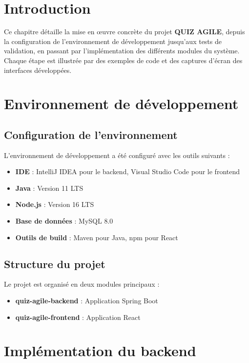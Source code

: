 \documentclass[12pt,a4paper]{report}
\begin{document}
\section{Introduction}

Ce chapitre détaille la mise en œuvre concrète du projet \textbf{QUIZ AGILE}, depuis la configuration de l'environnement de développement jusqu'aux tests de validation, en passant par l'implémentation des différents modules du système. Chaque étape est illustrée par des exemples de code et des captures d'écran des interfaces développées.

\section{Environnement de développement}

\subsection{Configuration de l'environnement}

L'environnement de développement a été configuré avec les outils suivants :

\begin{itemize}
    \item \textbf{IDE} : IntelliJ IDEA pour le backend, Visual Studio Code pour le frontend
    \item \textbf{Java} : Version 11 LTS
    \item \textbf{Node.js} : Version 16 LTS
    \item \textbf{Base de données} : MySQL 8.0
    \item \textbf{Outils de build} : Maven pour Java, npm pour React
\end{itemize}

\subsection{Structure du projet}

Le projet est organisé en deux modules principaux :

\begin{itemize}
    \item \textbf{quiz-agile-backend} : Application Spring Boot
    \item \textbf{quiz-agile-frontend} : Application React
\end{itemize}

\section{Implémentation du backend}
\end{document}

